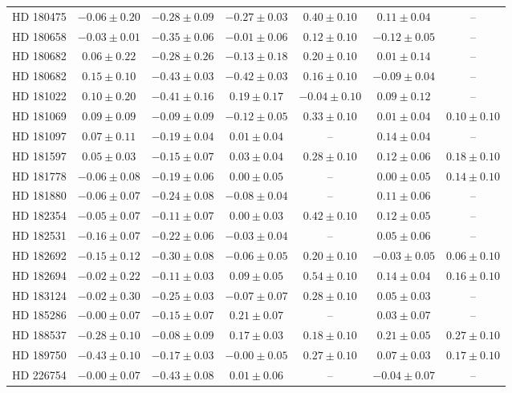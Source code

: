 \begin{table*}
\begin{tabular}{ccccccc}
HD 180475 & $-0.06 \pm 0.20$ & $-0.28 \pm 0.09$ & $-0.27 \pm 0.03$ & $0.40 \pm 0.10$ & $0.11 \pm 0.04$ & -- \\
HD 180658 & $-0.03 \pm 0.01$ & $-0.35 \pm 0.06$ & $-0.01 \pm 0.06$ & $0.12 \pm 0.10$ & $-0.12 \pm 0.05$ & -- \\
HD 180682 & $0.06 \pm 0.22$ & $-0.28 \pm 0.26$ & $-0.13 \pm 0.18$ & $0.20 \pm 0.10$ & $0.01 \pm 0.14$ & -- \\
HD 180682 & $0.15 \pm 0.10$ & $-0.43 \pm 0.03$ & $-0.42 \pm 0.03$ & $0.16 \pm 0.10$ & $-0.09 \pm 0.04$ & -- \\
HD 181022 & $0.10 \pm 0.20$ & $-0.41 \pm 0.16$ & $0.19 \pm 0.17$ & $-0.04 \pm 0.10$ & $0.09 \pm 0.12$ & -- \\
HD 181069 & $0.09 \pm 0.09$ & $-0.09 \pm 0.09$ & $-0.12 \pm 0.05$ & $0.33 \pm 0.10$ & $0.01 \pm 0.04$ & $0.10 \pm 0.10$ \\
HD 181097 & $0.07 \pm 0.11$ & $-0.19 \pm 0.04$ & $0.01 \pm 0.04$ & -- & $0.14 \pm 0.04$ & -- \\
HD 181597 & $0.05 \pm 0.03$ & $-0.15 \pm 0.07$ & $0.03 \pm 0.04$ & $0.28 \pm 0.10$ & $0.12 \pm 0.06$ & $0.18 \pm 0.10$ \\
HD 181778 & $-0.06 \pm 0.08$ & $-0.19 \pm 0.06$ & $0.00 \pm 0.05$ & -- & $0.00 \pm 0.05$ & $0.14 \pm 0.10$ \\
HD 181880 & $-0.06 \pm 0.07$ & $-0.24 \pm 0.08$ & $-0.08 \pm 0.04$ & -- & $0.11 \pm 0.06$ & -- \\
HD 182354 & $-0.05 \pm 0.07$ & $-0.11 \pm 0.07$ & $0.00 \pm 0.03$ & $0.42 \pm 0.10$ & $0.12 \pm 0.05$ & -- \\
HD 182531 & $-0.16 \pm 0.07$ & $-0.22 \pm 0.06$ & $-0.03 \pm 0.04$ & -- & $0.05 \pm 0.06$ & -- \\
HD 182692 & $-0.15 \pm 0.12$ & $-0.30 \pm 0.08$ & $-0.06 \pm 0.05$ & $0.20 \pm 0.10$ & $-0.03 \pm 0.05$ & $0.06 \pm 0.10$ \\
HD 182694 & $-0.02 \pm 0.22$ & $-0.11 \pm 0.03$ & $0.09 \pm 0.05$ & $0.54 \pm 0.10$ & $0.14 \pm 0.04$ & $0.16 \pm 0.10$ \\
HD 183124 & $-0.02 \pm 0.30$ & $-0.25 \pm 0.03$ & $-0.07 \pm 0.07$ & $0.28 \pm 0.10$ & $0.05 \pm 0.03$ & -- \\
HD 185286 & $-0.00 \pm 0.07$ & $-0.15 \pm 0.07$ & $0.21 \pm 0.07$ & -- & $0.03 \pm 0.07$ & -- \\
HD 188537 & $-0.28 \pm 0.10$ & $-0.08 \pm 0.09$ & $0.17 \pm 0.03$ & $0.18 \pm 0.10$ & $0.21 \pm 0.05$ & $0.27 \pm 0.10$ \\
HD 189750 & $-0.43 \pm 0.10$ & $-0.17 \pm 0.03$ & $-0.00 \pm 0.05$ & $0.27 \pm 0.10$ & $0.07 \pm 0.03$ & $0.17 \pm 0.10$ \\
HD 226754 & $-0.00 \pm 0.07$ & $-0.43 \pm 0.08$ & $0.01 \pm 0.06$ & -- & $-0.04 \pm 0.07$ & -- \\
\hline
\end{tabular}
\end{table*}
